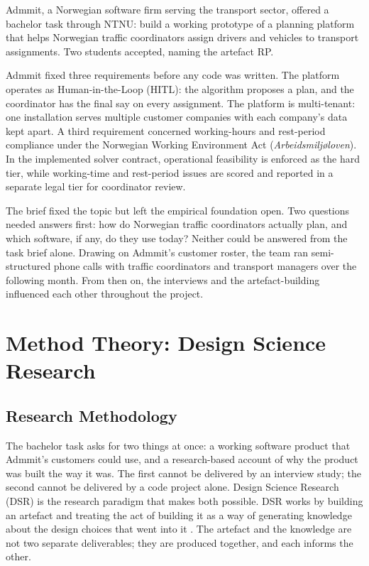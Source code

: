 Admmit, a Norwegian software firm serving the transport sector, offered a bachelor task through NTNU: build a working prototype of a planning platform that helps Norwegian traffic coordinators assign drivers and vehicles to transport assignments. Two students accepted, naming the artefact RP.

Admmit fixed three requirements before any code was written. The platform operates as Human-in-the-Loop (HITL): the algorithm proposes a plan, and the coordinator has the final say on every assignment. The platform is multi-tenant: one installation serves multiple customer companies with each company's data kept apart. A third requirement concerned working-hours and rest-period compliance under the Norwegian Working Environment Act (\textit{Arbeidsmiljøloven}). In the implemented solver contract, operational feasibility is enforced as the hard tier, while working-time and rest-period issues are scored and reported in a separate legal tier for coordinator review.

The brief fixed the topic but left the empirical foundation open. Two questions needed answers first: how do Norwegian traffic coordinators actually plan, and which software, if any, do they use today? Neither could be answered from the task brief alone. Drawing on Admmit's customer roster, the team ran semi-structured phone calls with traffic coordinators and transport managers over the following month. From then on, the interviews and the artefact-building influenced each other throughout the project.

\section{Method Theory: Design Science Research}
\label{sec:dsr-dsrm}

\subsection{Research Methodology}
\label{sec:research-methodology}

The bachelor task asks for two things at once: a working software product that Admmit's customers could use, and a research-based account of why the product was built the way it was. The first cannot be delivered by an interview study; the second cannot be delivered by a code project alone. Design Science Research (DSR) is the research paradigm that makes both possible. DSR works by building an artefact and treating the act of building it as a way of generating knowledge about the design choices that went into it \parencite{hevner2007threecycle}. The artefact and the knowledge are not two separate deliverables; they are produced together, and each informs the other.

